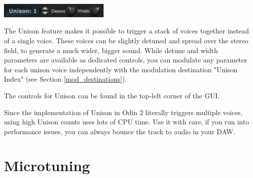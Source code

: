 \begin{center}
    \includegraphics[width=0.4\textwidth]{graphics/unison.png}
\end{center}

The Unison feature makes it possible to trigger a stack of voices together instead of a single voice. These voices can be slightly detuned and spread over the stereo field, to generate a much wider, bigger sound. While detune and width parameters are available as dedicated controls, you can modulate any parameter for each unison voice independently with the modulation destination "Unison Index" (see Section \ref{mod_destinations}).

\vspace{3mm}
The controls for Unison can be found in the top-left corner of the GUI.

\vspace{3mm}
\begin{tcolorbox}[colback=yellow!10!white,
        colframe=white!20!black,
        center,
        valign=top,
        halign=left,
        center title,
        width=\textwidth]

    Since the implementation of Unison in Odin 2 literally triggers multiple voices, using high Unison counts uses lots of CPU time. Use it with care, if you run into performance issues, you can always bounce the track to audio in your DAW.
\end{tcolorbox}




\section{Microtuning}
\label{microtuning}

